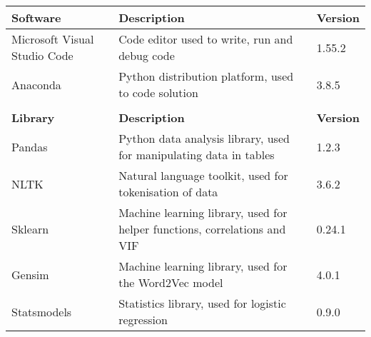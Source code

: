 \begin{tabular}{|p{30mm}|p{70mm}|l|} \hline
\textbf{Software} & \textbf{Description} & \textbf{Version} \\ \hline
Microsoft Visual Studio Code & Code editor used to write, run and debug code & 1.55.2 \\ \hline
Anaconda & Python distribution platform, used to code solution & 3.8.5 \\ \hline
\multicolumn{3}{c}{} \\ \hline
\textbf{Library} & \textbf{Description} & \textbf{Version} \\ \hline
Pandas & Python data analysis library, used for manipulating data in tables & 1.2.3 \\ \hline
NLTK & Natural language toolkit, used for tokenisation of data & 3.6.2 \\ \hline
Sklearn & Machine learning library, used for helper functions, correlations and VIF & 0.24.1 \\ \hline
Gensim & Machine learning library, used for the Word2Vec model & 4.0.1 \\ \hline
Statsmodels & Statistics library, used for logistic regression & 0.9.0 \\ \hline
\end{tabular}